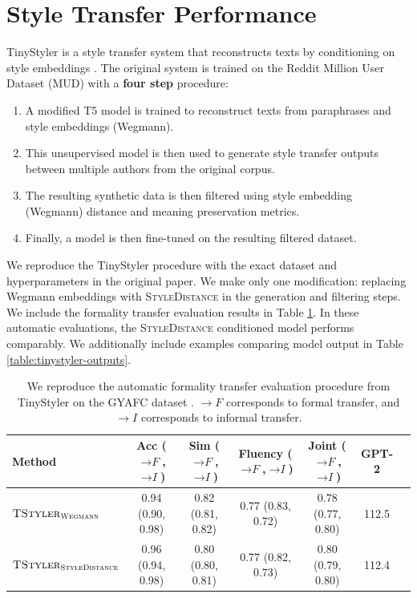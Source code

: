 \newpage
\section{Style Transfer Performance}
\label{sec:appendix:tinystyler}

\noindent TinyStyler is a style transfer system that reconstructs texts by conditioning on style embeddings \citet{tinystyler}. The original system is trained on the Reddit Million User Dataset (MUD) \cite{khan2021deepmetriclearningapproach} with a \textbf{four step} procedure:
\begin{enumerate}
    \item A modified T5 model \cite{t5andc4} is trained to reconstruct texts from paraphrases and style embeddings (Wegmann).
    \item This unsupervised model is then used to generate style transfer outputs between multiple authors from the original corpus.
    \item The resulting synthetic data is then filtered using style embedding (Wegmann) distance and meaning preservation metrics.
    \item Finally, a model is then fine-tuned on the resulting filtered dataset.
\end{enumerate}
\noindent We reproduce the TinyStyler procedure with the exact dataset and hyperparameters in the original paper. We make only one modification: replacing Wegmann embeddings with \textsc{StyleDistance} in the generation and filtering steps. We include the formality transfer evaluation results in Table \ref{table:tstyler-formal}. In these automatic evaluations, the  \textsc{StyleDistance} conditioned model performs comparably. We additionally include examples comparing model output in Table \ref{table:tinystyler-outputs}.

\begin{table}[H]
\fontsize{8}{10}\selectfont
\centering

\begin{tabular}{lcccccc}
\toprule
Method & Acc ($\rightarrow \textit{F}$,$\rightarrow \textit{I}$) &  Sim ($\rightarrow \textit{F}$,$\rightarrow \textit{I}$) & Fluency ($\rightarrow \textit{F}$,$\rightarrow \textit{I}$) & Joint ($\rightarrow \textit{F}$,$\rightarrow \textit{I}$) & GPT-2  \\
\midrule
$\textsc{TStyler}_{\textsc{Wegmann}}$ & 0.94 (0.90, 0.98) & 0.82 (0.81, 0.82) & 0.77 (0.83, 0.72) & 0.78 (0.77, 0.80) & 112.5  \\
$\textsc{TStyler}_{\textsc{StyleDistance}}$ &  0.96 (0.94, 0.98) & 0.80 (0.80, 0.81) & 0.77 (0.82, 0.73) & 0.80 (0.79, 0.80) & 112.4 \\
\bottomrule
\end{tabular}

\caption{We reproduce the automatic formality transfer evaluation procedure from TinyStyler \cite{tinystyler} on the GYAFC dataset \cite{gyafc}. $\rightarrow F$ corresponds to formal transfer, and $\rightarrow I$ corresponds to informal transfer.
}
\label{table:tstyler-formal}
\end{table}


\tinystyleroutputs

